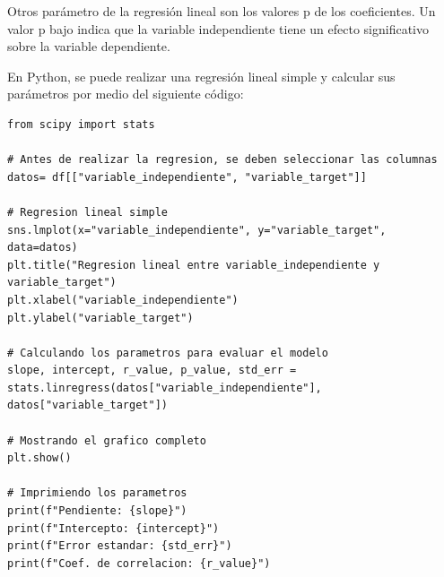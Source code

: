 \documentclass[a4paper, 12pt]{book}
\begin{document}
Otros parámetro de la regresión lineal son los valores p de los coeficientes. Un valor p bajo indica que la variable independiente tiene un efecto significativo sobre la variable dependiente.

En Python, se puede realizar una regresión lineal simple y calcular sus parámetros por medio del siguiente código:
\begin{verbatim}
from scipy import stats
	
# Antes de realizar la regresion, se deben seleccionar las columnas
datos= df[["variable_independiente", "variable_target"]]
	
# Regresion lineal simple
sns.lmplot(x="variable_independiente", y="variable_target", data=datos)
plt.title("Regresion lineal entre variable_independiente y variable_target")
plt.xlabel("variable_independiente")
plt.ylabel("variable_target")

# Calculando los parametros para evaluar el modelo
slope, intercept, r_value, p_value, std_err = stats.linregress(datos["variable_independiente"], datos["variable_target"])
	
# Mostrando el grafico completo
plt.show()
	
# Imprimiendo los parametros
print(f"Pendiente: {slope}")
print(f"Intercepto: {intercept}")
print(f"Error estandar: {std_err}")
print(f"Coef. de correlacion: {r_value}")
\end{verbatim}
\end{document}
